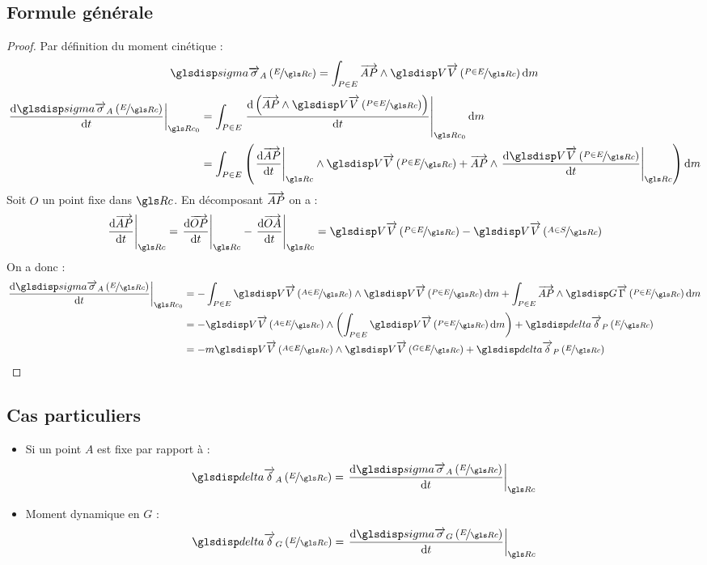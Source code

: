 	\subsection{Formule générale}
	\begin{theorem}
	\end{theorem}
	\begin{proof}
		Par définition du moment cinétique :
		\begin{equation*}
			\mcin{A}{E}=\ints[E]{\vect{AP}\wedge\V{P}{E}}
		\end{equation*}
		\begin{align*}
			\diff{\mcin{A}{E}}	&=\ints[E]{\diff{\left(\vect{AP}\wedge\V{P}{E}\right)}}\\
								&=\ints[E]{\left(\diff[\Rc]{\vect{AP}}\wedge\V{P}{E}+\vect{AP}\wedge\diff[\Rc]{\V{P}{E}}\right)}
		\end{align*}
		Soit $O$ un point fixe dans $\Rc$. En décomposant $\overrightarrow{AP}$ on a :
		\begin{equation*}
			\diff[\Rc]{\vect{AP}}=\diff[\Rc]{\vect{OP}}-\diff[\Rc]{\vect{OA}}=\V{P}{E}-\V{A}{S}
		\end{equation*}
		On a donc :
		\begin{align*}
			\diff{\mcin{A}{E}}	&=-\ints[E]{\V{A}{E}\wedge\V{P}{E}}+\ints[E]{\vect{AP}\wedge\G{P}{E}}\\
								&=-\V{A}{E}\wedge\left(\ints[E]{\V{P}{E}}\right)+\mdyn{P}{E}\\
								&=-m\V{A}{E}\wedge\V{G}{E}+\mdyn{P}{E}
		\end{align*}
	\end{proof}
	
	
	\subsection{Cas particuliers}
	\begin{itemize}
		\item Si un point $A$ est fixe par rapport à \Rc :
			\begin{equation}
				\mdyn{A}{E}=\diff[\Rc]{\mcin{A}{E}}
			\end{equation}
		\item Moment dynamique en $G$ :
			\begin{equation}
				\mdyn{G}{E}=\diff[\Rc]{\mcin{G}{E}}
			\end{equation}			
	\end{itemize}
		
